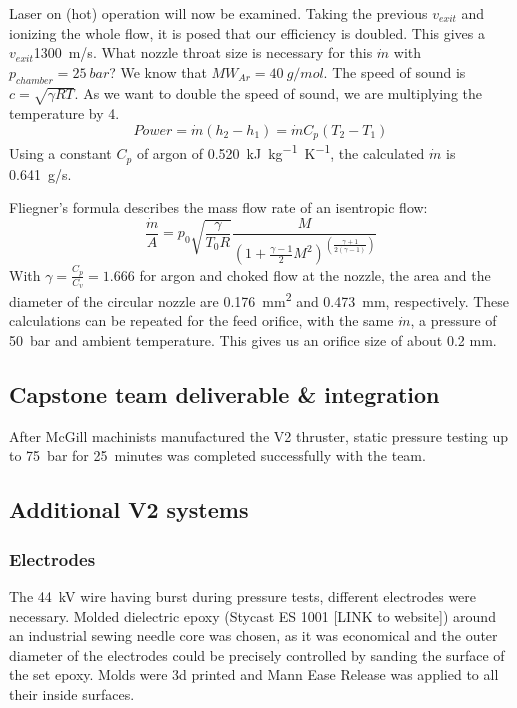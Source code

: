             Laser on (hot) operation will now be examined. Taking the previous $v_{exit}$ and ionizing the whole flow, it is posed that our efficiency is doubled. This gives a $v_{exit}$\approx \qty{1300}{m/s}. What nozzle throat size is necessary for this $\dot m$ with $p_{chamber} = \qty{25}{bar}$? We know that $MW_{Ar} = 40 \: g/mol$. The speed of sound is $c = \sqrt{\gamma R T}$. As we want to double the speed of sound, we are multiplying the temperature by 4.
            \[Power = \dot m (h_2-h_1)
            = \dot m C_p (T_2-T_1)\]
            Using a constant $C_p$ of argon of \qty{0.520}{kJ.kg^{-1}.K^{-1}}, the calculated $\dot m$ is \qty{0.641}{g/s}.
            
            Fliegner's formula describes the mass flow rate of an isentropic flow:
            \[\frac{\dot m}{A} = p_0\sqrt{\frac{\gamma}{T_0 R}}\frac{M}{(1+\frac{\gamma-1}{2}M^2)^{(\frac{\gamma+1}{2(\gamma-1)})}}\]
            With $\gamma = \frac{C_p}{C_v} = 1.666$ for argon and choked flow at the nozzle, the area and the diameter of the circular nozzle are \qty{0.176}{mm^2} and \qty{0.473}{mm}, respectively. These calculations can be repeated for the feed orifice, with the same $\dot m$, a pressure of \qty{50}{bar} and ambient temperature. This gives us an orifice size of about 0.2 mm.

        \subsection{Capstone team deliverable \& integration}
            
            After McGill machinists manufactured the V2 thruster, static pressure testing up to \qty{75}{bar} for \qty{25}{minutes} was completed successfully with the team. 
        

        \subsection{Additional V2 systems}

            \subsubsection{Electrodes}
                The \qty{44}{kV} wire having burst during pressure tests, different electrodes were necessary. Molded dielectric epoxy (Stycast ES 1001 [LINK to website]) around an industrial sewing needle core was chosen, as it was economical and the outer diameter of the electrodes could be precisely controlled by sanding the surface of the set epoxy. Molds were 3d printed and Mann Ease Release was applied to all their inside surfaces.

